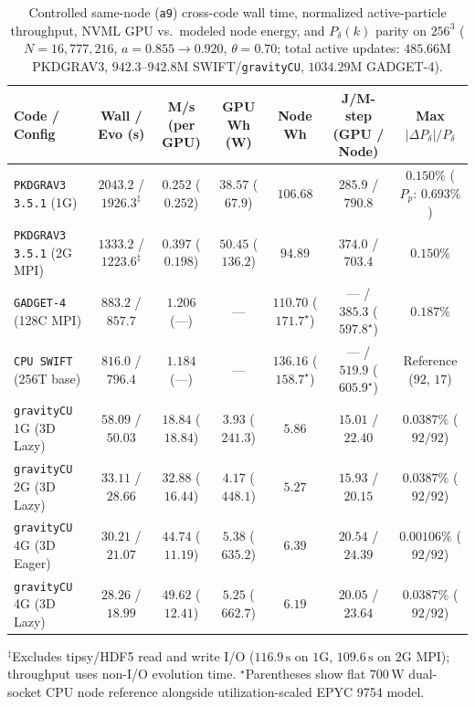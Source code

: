 \documentclass[aps,prd,reprint,superscriptaddress,nofootinbib,amsmath,amssymb,floatfix,longbibliography]{revtex4-2}
\begin{document}
\begin{table}[!tbp]
\caption{Controlled same-node (\texttt{a9}) cross-code wall time, normalized active-particle throughput, NVML GPU vs.\ modeled node energy, and $P_\delta(k)$ parity on $256^3$ ($N = 16{,}777{,}216$, $a = 0.855 \rightarrow 0.920$, $\theta = 0.70$; total active updates: $485.66\mathrm{M}$ PKDGRAV3, $942.3$--$942.8\mathrm{M}$ SWIFT/\texttt{gravityCU}, $1034.29\mathrm{M}$ GADGET-4).}\label{tab:crosscode}
\scriptsize
\setlength{\tabcolsep}{2.4pt}
\begin{ruledtabular}
\begin{tabular}{lcccccc}
Code / Config & Wall / Evo (s) & M/s (per GPU) & GPU Wh (W) & Node Wh & J/M-step (GPU / Node) & Max $|\Delta P_\delta|/P_\delta$ \\
\hline
\texttt{PKDGRAV3 3.5.1} (1G) & $2043.2$ / $1926.3^\ddagger$ & $0.252$ ($0.252$) & $38.57$ ($67.9$) & $106.68$ & $285.9$ / $790.8$ & $0.150\%$ ($P_p$: $0.693\%$) \\
\texttt{PKDGRAV3 3.5.1} (2G MPI) & $1333.2$ / $1223.6^\ddagger$ & $0.397$ ($0.198$) & $50.45$ ($136.2$) & $94.89$ & $374.0$ / $703.4$ & $0.150\%$ \\
\texttt{GADGET-4} (128C MPI) & $883.2$ / $857.7$ & $1.206$ (---) & --- & $110.70$ ($171.7^\star$) & --- / $385.3$ ($597.8^\star$) & $0.187\%$ \\
\texttt{CPU SWIFT} (256T base) & $816.0$ / $796.4$ & $1.184$ (---) & --- & $136.16$ ($158.7^\star$) & --- / $519.9$ ($605.9^\star$) & Reference ($92$, $17$) \\
\texttt{gravityCU} 1G (3D Lazy) & $58.09$ / $50.03$ & $18.84$ ($18.84$) & $\mathbf{3.93}$ ($241.3$) & $5.86$ & $\mathbf{15.01}$ / $22.40$ & $0.0387\%$ ($92/92$) \\
\texttt{gravityCU} 2G (3D Lazy) & $33.11$ / $28.66$ & $32.88$ ($16.44$) & $4.17$ ($448.1$) & $\mathbf{5.27}$ & $15.93$ / $\mathbf{20.15}$ & $0.0387\%$ ($92/92$) \\
\texttt{gravityCU} 4G (3D Eager) & $30.21$ / $21.07$ & $44.74$ ($11.19$) & $5.38$ ($635.2$) & $6.39$ & $20.54$ / $24.39$ & $\mathbf{0.00106\%}$ ($92/92$) \\
\texttt{gravityCU} 4G (3D Lazy) & $\mathbf{28.26}$ / $\mathbf{18.99}$ & $\mathbf{49.62}$ ($12.41$) & $5.25$ ($662.7$) & $6.19$ & $20.05$ / $23.64$ & $0.0387\%$ ($92/92$) \\
\end{tabular}
\end{ruledtabular}
\begin{flushleft}
\footnotesize $^\ddagger$Excludes tipsy/HDF5 read and write I/O ($116.9\,\mathrm{s}$ on $1\mathrm{G}$, $109.6\,\mathrm{s}$ on $2\mathrm{G}$ MPI); throughput uses non-I/O evolution time. $^\star$Parentheses show flat $700\,\mathrm{W}$ dual-socket CPU node reference alongside utilization-scaled EPYC 9754 model.
\end{flushleft}
\end{table}
\end{document}
